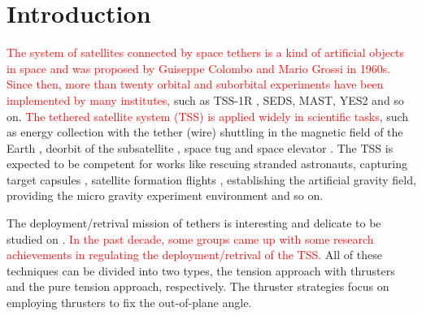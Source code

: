 \documentclass[3p]{elsarticle}
\theoremstyle{plain}
\begin{document}
\section{Introduction}
\textcolor{red}{The system of satellites connected by space tethers is a kind of artificial objects in space and was proposed by Guiseppe Colombo and Mario Grossi in 1960s. Since then, more than twenty orbital and suborbital experiments have been implemented by many institutes,} such as TSS-1R \cite{lanoix2005effect}, SEDS, MAST, YES2 \cite{williams2012review} and so on.
\textcolor{red}{The tethered satellite system (TSS) is applied widely in scientific tasks}, such as energy collection with the tether (wire) shuttling in the magnetic field of the Earth \cite{lanoix2005effect}, deorbit of the subsatellite \cite{khan2014analysis}, space tug \cite{wen2016constrained} and space elevator \cite{kojima2015mission}. The TSS is expected to be competent for works like rescuing stranded astronauts, capturing target capsules \cite{huang2015adaptive}, satellite formation flights \cite{hallaj2015tethered,alary2015dynamics}, establishing the artificial gravity field, providing the micro gravity experiment environment \cite{chung2007nonlinear} and so on.\par
The deployment/retrival mission of tethers is interesting and delicate to be studied on \cite{Fujii2012Deployment,steindl2014optimal,cai2014deployment,ma2014coordinated,jung2015nonlinear,li2016libration}.
\textcolor{red}{In the past decade, some groups came up with some research achievements in regulating the deployment/retrival of the TSS.}
All of these techniques can be divided into two types, the tension approach with thrusters and the pure tension approach, respectively. The thruster strategies focus on employing thrusters to fix the out-of-plane angle.
\end{document}
